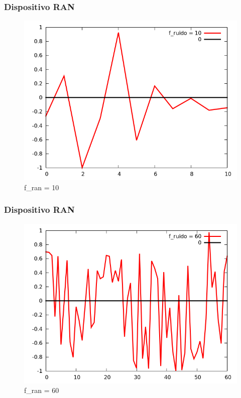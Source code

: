 \documentclass{beamer}
\begin{document}
\begin{frame}
 \frametitle{Dispositivo RAN}
 \begin{figure}
  \includegraphics[scale=0.2]{./images/f_ran_10.png}
  \caption{f\_ran = 10}
   \end{figure}
\end{frame}

\begin{frame}
 \frametitle{Dispositivo RAN}
 \begin{figure}
  \includegraphics[scale=0.2]{./images/f_ran_60.png}
  \caption{f\_ran = 60}
   \end{figure}
\end{frame}
\end{document}
